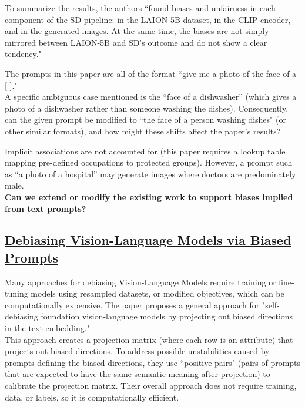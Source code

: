 \documentclass[12pt]{amsart}
\begin{document}
To summarize the results, the authors ``found biases and unfairness in each component of the SD pipeline: in the LAION-5B dataset, in the CLIP encoder, and in the generated images. At the same time, the biases are not simply mirrored between LAION-5B and SD’s outcome and do not show a clear tendency."

\begin{discussion*}
The prompts in this paper are all of the format ``give me a photo of the face of a [ ]." \\

A specific ambiguous case mentioned is the ``face of a dishwasher” (which gives a photo of a dishwasher rather than someone washing the dishes). Consequently, can the given prompt be modified to ``the face of a person washing dishes" (or other similar formats), and how might these shifts affect the paper's results?
\end{discussion*}

\begin{extension*}
Implicit associations are not accounted for (this paper requires a lookup table mapping pre-defined occupations to protected groups). However, a prompt such as “a photo of a hospital” may generate images where doctors are predominately male. \\

\noindent \textbf{Can we extend or modify the existing work to support biases implied from text prompts?} 
\end{extension*}

\newpage

\subsection{\href{https://arxiv.org/pdf/2302.00070.pdf}{Debiasing Vision-Language Models via Biased Prompts}}\label{embedding}

\begin{approach*}
Many approaches for debiasing Vision-Language Models require training or fine-tuning models using resampled datasets, or modified objectives, which can be computationally expensive. The paper proposes a general approach for "self-debiasing foundation vision-language models by projecting out biased directions in the text embedding." \\

This approach creates a projection matrix (where each row is an attribute) that projects out biased directions. To address possible unstabilities caused by prompts defining the biased directions, they use ``positive pairs" (pairs of prompts that are expected to have the same semantic meaning after projection) to calibrate the projection matrix. Their overall approach does not require training, data, or labels, so it is computationally efficient.
\end{approach*}
\end{document}
